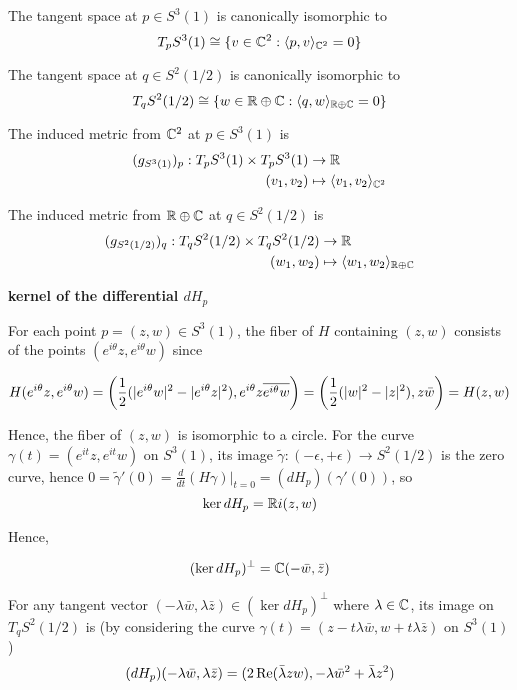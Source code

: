 \begin{longproof}
	The tangent space at $p \in S^3(1)$ is canonically isomorphic to
	$$
		T_p S^3(1) \cong \set{v \in \C^2: \inner{p, v}_{\C^2} = 0}
	$$
	
	The tangent space at $q \in S^2(1/2)$ is canonically isomorphic to
	$$
		T_q S^2(1/2) \cong \set{w \in \R \oplus \C: \inner{q, w}_{\R \oplus \C} = 0}
	$$
		
	The induced metric from $\C^2$ at $p \in S^3(1)$ is
	\begin{align*}
		(g_{S^3(1)})_p: T_p S^3(1) \times T_p S^3(1) &\to \R \\
		(v_1, v_2) &\mapsto \inner{v_1, v_2}_{\C^2}
	\end{align*}
	
	The induced metric from $\R \oplus \C$ at $q \in S^2(1/2)$ is
	\begin{align*}
		(g_{S^2(1/2)})_q: T_q S^2(1/2) \times T_q S^2(1/2) &\to \R \\
		(w_1, w_2) &\mapsto \inner{w_1, w_2}_{\R \oplus \C}
	\end{align*}
	
	\textbf{kernel of the differential $dH_p$}
	
	For each point $p = (z, w) \in S^3(1)$, the fiber of $H$ containing $(z, w)$ consists of the points $(e^{i\theta} z, e^{i\theta} w)$ since
	
	\begin{align*}
		H(e^{i\theta} z, e^{i\theta} w) = \tuple*{\frac{1}{2}(\abs{e^{i\theta} w}^2 - \abs{e^{i\theta} z}^2), e^{i\theta} z \overline{e^{i\theta} w}} = \tuple*{\frac{1}{2}(\abs{w}^2 - \abs{z}^2), z \bar{w}} = H(z, w)
	\end{align*}
	
	Hence, the fiber of $(z, w)$ is isomorphic to a circle. For the curve $\gamma(t) = (e^{it} z, e^{it} w)$ on $S^3(1)$, its image $\tilde{\gamma}: (- \epsilon, + \epsilon) \to S^2(1/2)$ is the zero curve, hence $0 = \tilde{\gamma}'(0) = 
	\frac{d}{dt}(H \gamma)\vert_{t=0} = (dH_p)(\gamma'(0))$, so
	$$
		\ker dH_p = \R i (z, w)
	$$
	
	Hence,
	
	$$
		(\ker dH_p)^\perp = \C(-\bar{w}, \bar{z})
	$$	
	
	For any tangent vector $(-\lambda \bar{w}, \lambda \bar{z}) \in (\ker dH_p)^\perp$ where $\lambda \in \C$, its image on $T_q S^2(1/2)$ is (by considering the curve $\gamma(t) = (z - t \lambda \bar{w}, w + t \lambda \bar{z})$ on $S^3(1)$)
	$$
		(dH_p)(-\lambda \bar{w}, \lambda \bar{z}) = (2 \real(\bar{\lambda} z w), -\lambda \bar{w}^2 + \bar{\lambda} z^2 )
	$$
	

\end{longproof}
